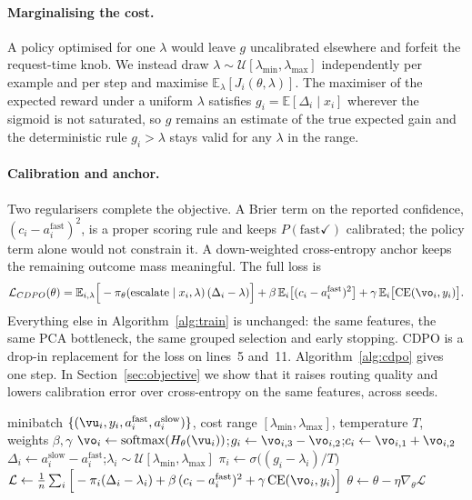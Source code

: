 \documentclass{article}
\newcommand{\fast}{\mathrm{fast}}
\newcommand{\slow}{\mathrm{slow}}
\newcommand{\gain}{g}
\newcommand{\cdpo}{CDPO}
\begin{document}
\paragraph{Marginalising the cost.} A policy optimised for one $\lambda$ would leave $\gain$ uncalibrated elsewhere and forfeit the request-time knob. We instead draw $\lambda\sim\mathcal{U}[\lambda_{\min},\lambda_{\max}]$ independently per example and per step and maximise $\mathbb{E}_\lambda[J_i(\theta,\lambda)]$. The maximiser of the expected reward under a uniform $\lambda$ satisfies $\gain_i=\mathbb{E}[\Delta_i\mid x_i]$ wherever the sigmoid is not saturated, so $\gain$ remains an estimate of the true expected gain and the deterministic rule $\gain_i>\lambda$ stays valid for any $\lambda$ in the range.

\paragraph{Calibration and anchor.} Two regularisers complete the objective. A Brier term on the reported confidence, $(c_i-a_i^{\fast})^2$, is a proper scoring rule and keeps $P(\fast\checkmark)$ calibrated; the policy term alone would not constrain it. A down-weighted cross-entropy anchor keeps the remaining outcome mass meaningful. The full loss is
\begin{equation}
  \mathcal{L}_{\cdpo}(\theta)=\mathbb{E}_{i,\lambda}\Big[-\pi_\theta(\text{escalate}\mid x_i,\lambda)\,(\Delta_i-\lambda)\Big]
  +\beta\,\mathbb{E}_i\big[(c_i-a_i^{\fast})^2\big]
  +\gamma\,\mathbb{E}_i\big[\mathrm{CE}(\vo_i,y_i)\big].
  \label{eq:cdpo}
\end{equation}
Everything else in Algorithm~\ref{alg:train} is unchanged: the same features, the same PCA bottleneck, the same grouped selection and early stopping. \cdpo{} is a drop-in replacement for the loss on lines~5 and~11. Algorithm~\ref{alg:cdpo} gives one step. In Section~\ref{sec:objective} we show that it raises routing quality and lowers calibration error over cross-entropy on the same features, across seeds.

\begin{algorithm}[t]
\caption{One \cdpo{} step for the decision head (backbone frozen)}
\label{alg:cdpo}
\begin{algorithmic}[1]
\REQUIRE minibatch $\{(\vu_i,y_i,a_i^{\fast},a_i^{\slow})\}$, cost range $[\lambda_{\min},\lambda_{\max}]$, temperature $T$, weights $\beta,\gamma$
\STATE $\vo_i\leftarrow\mathrm{softmax}(H_\theta(\vu_i))$;\quad $\gain_i\leftarrow\vo_{i,3}-\vo_{i,2}$;\quad $c_i\leftarrow\vo_{i,1}+\vo_{i,2}$
\STATE $\Delta_i\leftarrow a_i^{\slow}-a_i^{\fast}$;\quad $\lambda_i\sim\mathcal{U}[\lambda_{\min},\lambda_{\max}]$
\STATE $\pi_i\leftarrow\sigma\big((\gain_i-\lambda_i)/T\big)$ 
\STATE $\mathcal{L}\leftarrow\frac{1}{n}\sum_i\Big[-\pi_i(\Delta_i-\lambda_i)+\beta\,(c_i-a_i^{\fast})^2+\gamma\,\mathrm{CE}(\vo_i,y_i)\Big]$
\STATE $\theta\leftarrow\theta-\eta\nabla_\theta\mathcal{L}$ 
\end{algorithmic}
\end{algorithm}
\end{document}
